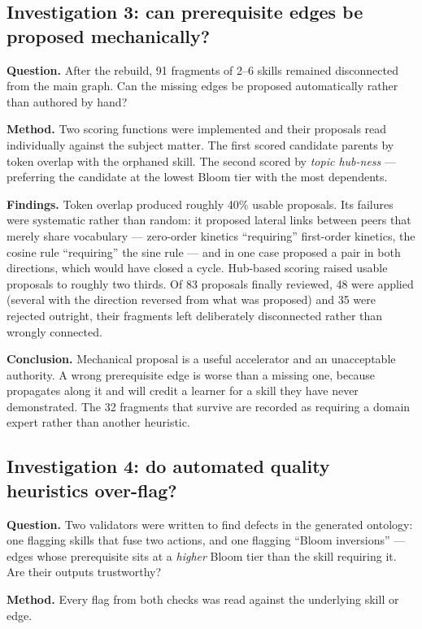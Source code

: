 \subsection{Investigation 3: can prerequisite edges be proposed mechanically?}

\textbf{Question.} After the rebuild, 91 fragments of 2--6 skills remained
disconnected from the main graph. Can the missing edges be proposed
automatically rather than authored by hand?

\textbf{Method.} Two scoring functions were implemented and their proposals
read individually against the subject matter. The first scored candidate parents
by token overlap with the orphaned skill. The second scored by
\emph{topic hub-ness} --- preferring the candidate at the lowest Bloom tier with
the most dependents.

\textbf{Findings.} Token overlap produced roughly 40\% usable proposals. Its
failures were systematic rather than random: it proposed lateral links between
peers that merely share vocabulary --- zero-order kinetics ``requiring''
first-order kinetics, the cosine rule ``requiring'' the sine rule --- and in one
case proposed a pair in both directions, which would have closed a cycle.
Hub-based scoring raised usable proposals to roughly two thirds. Of 83 proposals
finally reviewed, 48 were applied (several with the direction reversed from what
was proposed) and 35 were rejected outright, their fragments left deliberately
disconnected rather than wrongly connected.

\textbf{Conclusion.} Mechanical proposal is a useful accelerator and an
unacceptable authority. A wrong prerequisite edge is worse than a missing one,
because  propagates along it and will credit a learner for a
skill they have never demonstrated. The 32 fragments that survive are recorded
as requiring a domain expert rather than another heuristic.

\subsection{Investigation 4: do automated quality heuristics over-flag?}

\textbf{Question.} Two validators were written to find defects in the generated
ontology: one flagging skills that fuse two actions, and one flagging ``Bloom
inversions'' --- edges whose prerequisite sits at a \emph{higher} Bloom tier than
the skill requiring it. Are their outputs trustworthy?

\textbf{Method.} Every flag from both checks was read against the underlying
skill or edge.

